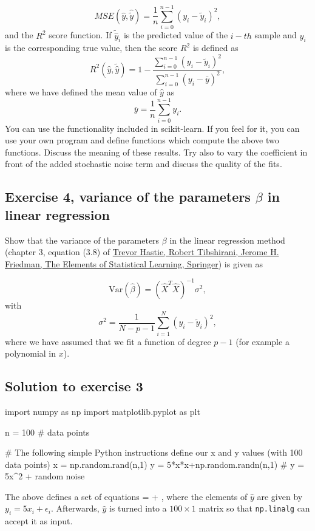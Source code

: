 \documentclass[%
oneside,                 %
final,                   %
10pt]{article}
\begin{document}
\noindent
\[ MSE(\hat{y},\hat{\tilde{y}}) = \frac{1}{n}
\sum_{i=0}^{n-1}(y_i-\tilde{y}_i)^2, 
\] 
and the $R^2$ score function.
If $\tilde{\hat{y}}_i$ is the predicted value of the $i-th$ sample and $y_i$ is the corresponding true value, then the score $R^2$ is defined as
\[
R^2(\hat{y}, \tilde{\hat{y}}) = 1 - \frac{\sum_{i=0}^{n - 1} (y_i - \tilde{y}_i)^2}{\sum_{i=0}^{n - 1} (y_i - \bar{y})^2},
\]
where we have defined the mean value  of $\hat{y}$ as
\[
\bar{y} =  \frac{1}{n} \sum_{i=0}^{n - 1} y_i.
\]
You can use the functionality included in scikit-learn. If you feel for it, you can use your own program and define functions which compute the above two functions. 
Discuss the meaning of these results. Try also to vary the coefficient in front of the added stochastic noise term and discuss the quality of the fits.




\subsection*{Exercise 4, variance of the parameters $\beta$ in linear regression}

Show that the variance of the parameters $\beta$ in the linear regression method (chapter 3, equation (3.8) of \href{{https://www.springer.com/gp/book/9780387848570}}{Trevor Hastie, Robert Tibshirani, Jerome H. Friedman, The Elements of Statistical Learning, Springer}) is given as 

\[
\mathrm{Var}(\hat{\beta}) = \left(\hat{X}^T\hat{X}\right)^{-1}\sigma^2,
\]
with 
\[
\sigma^2 = \frac{1}{N-p-1}\sum_{i=1}^{N} (y_i-\tilde{y}_i)^2,
\]
where we have assumed that we fit a function of degree $p-1$ (for example a polynomial in $x$). 

\subsection*{Solution to exercise 3}


\begin{print}
import numpy as np
import matplotlib.pyplot as plt

n = 100 # data points

# The following simple Python instructions define our x and y values (with 100 data points)
x = np.random.rand(n,1)
y = 5*x*x+np.random.randn(n,1) # y = 5x^2 + random noise

\end{print}

The above defines a set of equations
 = \hat{\beta} + \hat{\epsilon},
where the elements of $\hat{y}$ are given by $y_i = 5x_i + \epsilon_i$. Afterwards, $\hat{y}$ is turned into a $100\times1$ matrix so that \texttt{np.linalg} can accept it as input.
\end{document}
